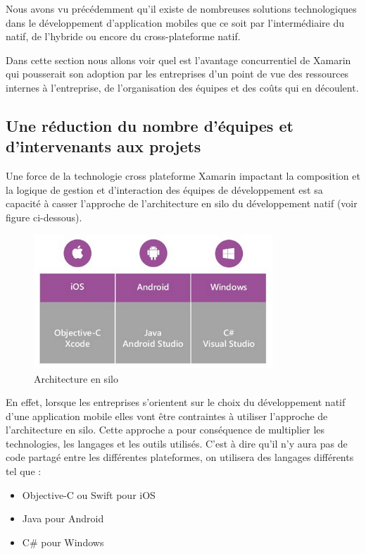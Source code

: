 \documentclass[11]{article}
\begin{document}
Nous avons vu précédemment qu’il existe de nombreuses solutions technologiques dans le développement d’application mobiles que ce soit par l’intermédiaire du natif, de l’hybride ou encore du cross-plateforme natif.
  
\vspace{0.5cm}
   
Dans cette section nous allons voir quel est l’avantage concurrentiel de Xamarin qui pousserait son adoption par les entreprises d’un point de vue des ressources internes à l'entreprise, de l’organisation des équipes et des coûts qui en découlent.

  \subsection{Une réduction du nombre d’équipes et d’intervenants aux projets}
Une force de la technologie cross plateforme Xamarin impactant la composition et la logique de gestion et d'interaction des équipes de développement est sa capacité à casser l’approche de l’architecture en silo du développement natif (voir figure ci-dessous).
 
 \begin{figure}[h]
    \centering
    \includegraphics[width=0.8\textwidth]{c1}
    \caption{Architecture en silo}
    \label{bat}
\end{figure}
 
 
 En effet, lorsque les entreprises s’orientent sur le choix du développement natif d’une application mobile elles vont être contraintes à utiliser l’approche de l’architecture en silo. Cette approche a pour conséquence de multiplier les technologies, les langages et les outils utilisés.
C’est à dire qu’il n’y aura pas de code partagé entre les différentes plateformes, on utilisera des langages différents tel que :
\begin{itemize}
\item Objective-C ou Swift pour iOS
\item Java pour Android
\item C\# pour Windows
\end{itemize}
  
\end{document}
